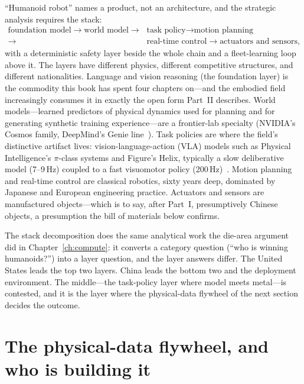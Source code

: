 ``Humanoid robot'' names a product, not an architecture, and the strategic analysis requires the stack:
\begin{align*}
\text{foundation model} \rightarrow \text{world model} \rightarrow{}& \text{task policy} \rightarrow \text{motion planning}\\
\rightarrow{}& \text{real-time control} \rightarrow \text{actuators and sensors},
\end{align*}
with a deterministic safety layer beside the whole chain and a fleet-learning loop above it. The layers have different physics, different competitive structures, and different nationalities. Language and vision reasoning (the foundation layer) is the commodity this book has spent four chapters on---and the embodied field increasingly consumes it in exactly the open form Part~II describes. World models---learned predictors of physical dynamics used for planning and for generating synthetic training experience---are a frontier-lab specialty (NVIDIA's Cosmos family, DeepMind's Genie line~\cite{cosmos,genie3}). Task policies are where the field's distinctive artifact lives: vision-language-action (VLA) models such as Physical Intelligence's $\pi$-class systems and Figure's Helix, typically a slow deliberative model (7--9\,Hz) coupled to a fast visuomotor policy (200\,Hz)~\cite{helix,pi-models}. Motion planning and real-time control are classical robotics, sixty years deep, dominated by Japanese and European engineering practice. Actuators and sensors are manufactured objects---which is to say, after Part~I, presumptively Chinese objects, a presumption the bill of materials below confirms.

The stack decomposition does the same analytical work the die-area argument did in Chapter~\ref{ch:compute}: it converts a category question (``who is winning humanoids?'') into a layer question, and the layer answers differ. The United States leads the top two layers. China leads the bottom two and the deployment environment. The middle---the task-policy layer where model meets metal---is contested, and it is the layer where the physical-data flywheel of the next section decides the outcome.

\section{The physical-data flywheel, and who is building it}
\label{sec:physical-flywheel}


